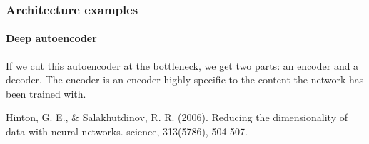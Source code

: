 \documentclass[9pt]{beamer}
\begin{document}








\begin{frame}
  \frametitle{Architecture examples}

  \framesubtitle{Deep autoencoder}

  \begin{center}
  \end{center}

  \medskip

  If we cut this autoencoder at the bottleneck, we get two parts: an
  encoder and a decoder. The encoder is an encoder highly specific to
  the content the network has been trained with.

  \bigskip

  {\footnotesize Hinton, G. E., \& Salakhutdinov,
    R. R. (2006). Reducing the dimensionality of data with neural
    networks. science, 313(5786), 504-507.}
\end{frame}
\end{document}
